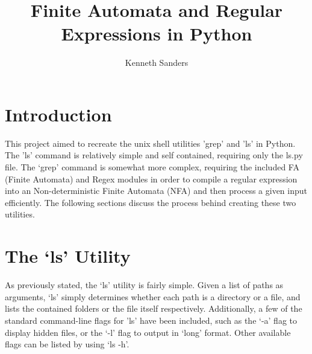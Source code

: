 \documentclass{article}
\begin{document}
\pretitle{ \begin{flushleft} \LARGE } 
\title{Finite Automata and Regular Expressions in Python}
\posttitle{ \end{flushleft} }
\preauthor{ \begin{flushleft} }
\author{Kenneth Sanders}
\postauthor{ \end{flushleft} }
\predate{ \begin{flushleft} }
\postdate{ \end{flushleft} }

\maketitle

\section*{Introduction}
This project aimed to recreate the unix shell utilities 'grep' and 'ls' in Python. The 'ls' command is relatively simple and self contained, requiring only the ls.py file. The `grep' command is somewhat more complex, requiring the included FA (Finite Automata) and Regex modules in order to compile a regular expression into an Non-deterministic Finite Automata (NFA) and then process a given input efficiently. The following sections discuss the process behind creating these two utilities.

\section*{The `ls' Utility}
As previously stated, the `ls' utility is fairly simple. Given a list of paths as arguments, `ls' simply determines whether each path is a directory or a file, and lists the contained folders or the file itself respectively. Additionally, a few of the standard command-line flags for 'ls' have been included, such as the `-a' flag to display hidden files, or the `-l' flag to output in `long' format. Other available flags can be listed by using `ls -h'.
\end{document}
